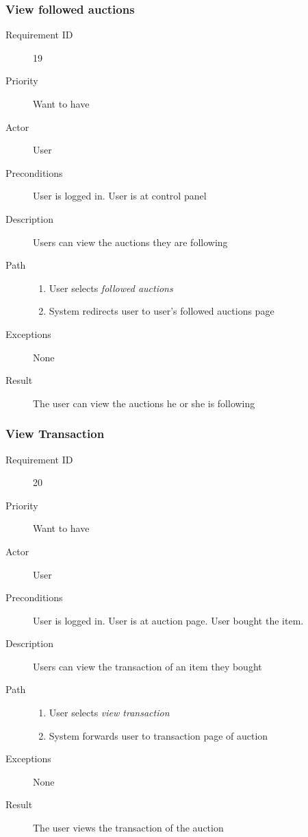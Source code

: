 		\subsubsection{View followed auctions}
			\begin{description}
				\item[Requirement ID] 19
				\item[Priority] Want to have
				\item[Actor] User
				\item[Preconditions] User is logged in. User is at control panel
				\item[Description] Users can view the auctions they are following
				\item[Path]
 					\begin{enumerate}
						\item User selects \emph{followed auctions}
						\item System redirects user to user's followed auctions page
					\end{enumerate}
				\item[Exceptions] None
				\item[Result] The user can view the auctions he or she is following
			\end{description}
		\subsubsection{View Transaction}
			\begin{description}
				\item[Requirement ID] 20
				\item[Priority] Want to have
				\item[Actor] User
				\item[Preconditions] User is logged in. User is at auction page. User bought the item.
				\item[Description] Users can view the transaction of an item they bought
				\item[Path]
 					\begin{enumerate}
						\item User selects \emph{view transaction}
						\item System forwards user to transaction page of auction
					\end{enumerate}
				\item[Exceptions] None
				\item[Result] The user views the transaction of the auction
			\end{description}
